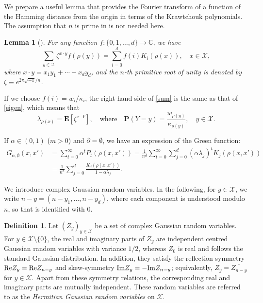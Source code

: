 \documentclass[a4paper,11pt]{article}
\theoremstyle{plain}
\newtheorem{lemma}[theorem]{Lemma}
\theoremstyle{definition}
\newtheorem{definition}[theorem]{Definition}
\begin{document}
We prepare a useful lemma that provides
the Fourier transform of a function of the Hamming
distance from the origin in terms of the Krawtchouk
polynomials. The assumption that $n$ is prime in
\cite[Lemma 4.6]{GM25a} is not needed here.

\begin{lemma}[\rm\cite{GM25a}]\label{lem:fourier}
  For any function $f:\{0,1,\ldots,d\}\to\mathbb{C}$,
  we have
  \begin{equation}\label{sum}
    \sum_{y\in \mathcal{X}}\zeta^{x\cdot y}f(\rho(y))
    =\sum_{i=0}^df(i)K_i(\rho(x)), \quad x\in \mathcal{X},
  \end{equation}
  where $x \cdot y=x_1 y_1+\cdots+x_d y_d$, and
  the $n$-th primitive root of unity is denoted by
  $\zeta\equiv e^{2\pi\sqrt{-1}/n}$.
\end{lemma}

If we choose $f(i)=w_i/\kappa_i$, the right-hand
side of \eqref{sum} is the same as that of
\eqref{eigen}, which means that
\[
  \lambda_{\rho(x)}=\mathbf{E}[\zeta^{x\cdot Y}],
  \quad \text{where} \quad
  \mathbf{P}(Y=y)=\frac{w_{\rho(y)}}{\kappa_{\rho(y)}},
  \quad y\in\mathcal{X}.
\]

If $\alpha\in(0,1)$ ($m>0$) and $\partial=\emptyset$,
we have an expression of the Green function:
\begin{align}
  G_{\alpha,\emptyset}(x,x')
  &=\sum_{t=0}^\infty \alpha^t P_t(\rho(x,x'))
  =\frac{1}{n^d}\sum_{t=0}^\infty\sum_{j=0}^d
  (\alpha\lambda_j)^t K_j(\rho(x,x'))\nonumber\\
  &=\frac{1}{n^d}\sum_{j=0}^d\frac{K_j(\rho(x,x'))}
  {1-\alpha\lambda_j}. \label{green_h}
\end{align}

We introduce complex Gaussian random variables.
In the following, for $y\in\mathcal{X}$, we write
$n-y=(n-y_1,\ldots,n-y_d)$, where each component
is understood modulo $n$, so that is identified
with $0$.

\begin{definition}\label{def:hermite}
  Let $(Z_y)_{y\in\mathcal{X}}$ be a set of
  complex Gaussian random variables.
  For $y\in\mathcal{X}\setminus\{0\}$, the real and
  imaginary parts of $Z_y$ are independent centred
  Gaussian random variables with variance $1/2$,
  whereas $Z_0$ is real and follows the standard
  Gaussian distribution. In addition, they
  satisfy the reflection symmetry 
  ${\rm Re}Z_y={\rm Re}Z_{n-y}$ and skew-symmetry
  ${\rm Im}Z_y=-{\rm Im}Z_{n-y}$; equivalently,
  $Z_y=\overline{Z_{n-y}}$ for $y\in\mathcal{X}$.
  Apart from these symmetry relations,
  the corresponding real and imaginary parts are
  mutually independent. These random variables are
  referred to as the
  {\it Hermitian Gaussian random variables}
  on $\mathcal{X}$.
\end{definition}
\end{document}
